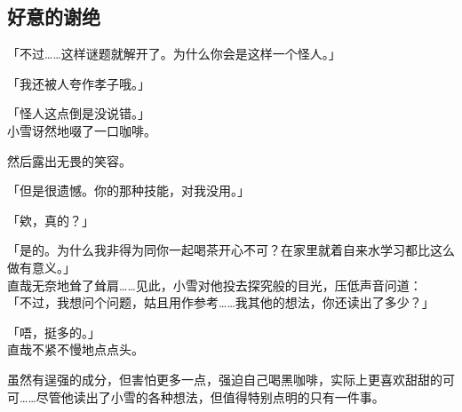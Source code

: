\subsection{好意的谢绝}

「不过……这样谜题就解开了。为什么你会是这样一个怪人。」

「我还被人夸作孝子哦。」

「怪人这点倒是没说错。」\\

小雪讶然地啜了一口咖啡。

然后露出无畏的笑容。

「但是很遗憾。你的那种技能，对我没用。」

「欸，真的？」

「是的。为什么我非得为同你一起喝茶开心不可？在家里就着自来水学习都比这么做有意义。」\\

直哉无奈地耸了耸肩……见此，小雪对他投去探究般的目光，压低声音问道：\\

「不过，我想问个问题，姑且用作参考……我其他的想法，你还读出了多少？」

「唔，挺多的。」\\

直哉不紧不慢地点点头。

虽然有逞强的成分，但害怕更多一点，强迫自己喝黑咖啡，实际上更喜欢甜甜的可可……尽管他读出了小雪的各种想法，但值得特别点明的只有一件事。\\

